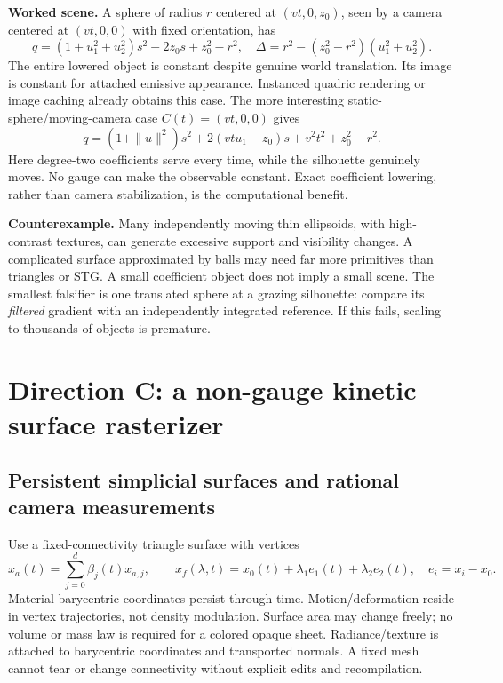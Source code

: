 \documentclass[10pt,letterpaper]{article}
\theoremstyle{remark}\newtheorem{counterexample}[proposition]{Counterexample}
\newcommand{\status}[1]{\textbf{#1.}}
\begin{document}
\status{Worked scene} A sphere of radius $r$ centered at $(vt,0,z_0)$, seen by a camera centered at $(vt,0,0)$ with fixed orientation, has
\begin{equation}
 q=(1+u_1^2+u_2^2)s^2-2z_0s+z_0^2-r^2,
 \quad \Delta=r^2-(z_0^2-r^2)(u_1^2+u_2^2).
\end{equation}
The entire lowered object is constant despite genuine world translation. Its image is constant for attached emissive appearance. Instanced quadric rendering or image caching already obtains this case. The more interesting static-sphere/moving-camera case $C(t)=(vt,0,0)$ gives
\begin{equation}
 q=(1+\|u\|^2)s^2+2(vtu_1-z_0)s+v^2t^2+z_0^2-r^2.
\end{equation}
Here degree-two coefficients serve every time, while the silhouette genuinely moves. No gauge can make the observable constant. Exact coefficient lowering, rather than camera stabilization, is the computational benefit.

\status{Counterexample} Many independently moving thin ellipsoids, with high-contrast textures, can generate excessive support and visibility changes. A complicated surface approximated by balls may need far more primitives than triangles or STG. A small coefficient object does not imply a small scene. The smallest falsifier is one translated sphere at a grazing silhouette: compare its \emph{filtered} gradient with an independently integrated reference. If this fails, scaling to thousands of objects is premature.

\section{Direction C: a non-gauge kinetic surface rasterizer}

\subsection{Persistent simplicial surfaces and rational camera measurements}
Use a fixed-connectivity triangle surface with vertices
\begin{equation}
 x_a(t)=\sum_{j=0}^d\beta_j(t)x_{a,j},\qquad
 x_f(\lambda,t)=x_0(t)+\lambda_1e_1(t)+\lambda_2e_2(t),
 \quad e_i=x_i-x_0.
\end{equation}
Material barycentric coordinates persist through time. Motion/deformation reside in vertex trajectories, not density modulation. Surface area may change freely; no volume or mass law is required for a colored opaque sheet. Radiance/texture is attached to barycentric coordinates and transported normals. A fixed mesh cannot tear or change connectivity without explicit edits and recompilation.
\end{document}
